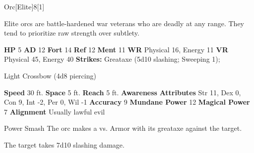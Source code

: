   \begin{monsection}{Orc}[Elite]{8}[1]
    \vspace{-1em}\vspace{-1em}
    \vspace{0em}

    
      Elite orcs are battle-hardened war veterans who are deadly at any range.
      They tend to prioritize raw strength over subtlety.
    
    

    \begin{spellcontent}
      \begin{spelltargetinginfo}
        \pari \textbf{HP} 5 \monsep
          \textbf{AD} 12 \monsep
          \textbf{Fort} 14 \monsep
          \textbf{Ref} 12 \monsep
          \textbf{Ment} 11
        \pari \textbf{WR} Physical 16, Energy 11 \monsep
        \textbf{VR} Physical 45, Energy 40
        \pari \textbf{Strikes:}
            Greataxe  (5d10 slashing; Sweeping 1);
\par Light Crossbow  (4d8 piercing)
      \end{spelltargetinginfo}
    \end{spellcontent}
    \begin{monsterfooter}
      \pari \textbf{Speed} 30 ft. \monsep
        \textbf{Space} 5 ft. \monsep
        \textbf{Reach} 5 ft.
      \pari \textbf{Awareness} 
      \pari \textbf{Attributes}
        Str 11, Dex 0,
        Con 9, Int -2,
        Per 0, Wil -1
      \pari \textbf{Accuracy} 9 \monsep
        \textbf{Mundane Power} 12 \monsep
      \textbf{Magical Power} 7
      \pari \textbf{Alignment} Usually lawful evil
    \end{monsterfooter}
  \end{monsection}
  \begin{freeability}{Power Smash}
       The orc makes a 
         vs. Armor
        with its greataxe against the target.
    
    \hit The target takes 7d10 slashing damage.
    \end{freeability}
  

